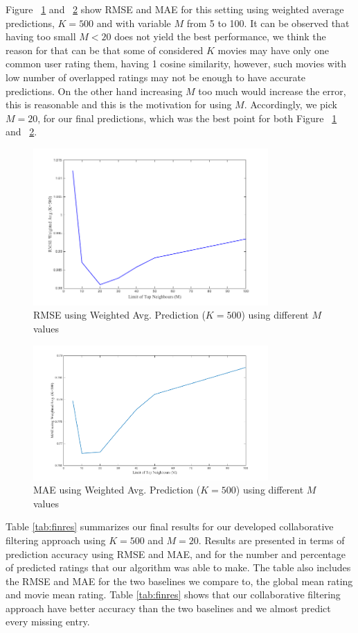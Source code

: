 Figure ~\ref{fig:rmsem} and ~\ref{fig:maem} show RMSE and MAE for this setting using weighted average predictions, $K=500$ and with variable $M$ from 5 to 100. It can be observed that having too small $M<20$ does not yield the best performance, we think the reason for that can be that some of considered $K$ movies may have only one common user rating them, having 1 cosine similarity, however, such movies with low number of overlapped ratings may not be enough to have accurate predictions. On the other hand increasing $M$ too much would increase the error, this is reasonable and this is the motivation for using $M$. Accordingly, we pick $M=20$, for our final predictions, which was the best point for both Figure ~\ref{fig:rmsem} and ~\ref{fig:maem}.
\begin{figure}[!ht]
  \centering
  \includegraphics[width=0.8\textwidth]{images/rmsem.png}
  \caption{RMSE using Weighted Avg.  Prediction ($K=500$) using different $M$ values}
  \label{fig:rmsem}
\end{figure}

\begin{figure}[!ht]
  \centering
  \includegraphics[width=0.8\textwidth]{images/MAEm.png}
  \caption{MAE using Weighted Avg.  Prediction ($K=500$) using different $M$ values}
  \label{fig:maem}
\end{figure}
Table \ref{tab:finres} summarizes our final results for our developed collaborative filtering approach using $K=500$ and $M=20$. Results are presented in terms of prediction accuracy using RMSE and MAE, and for the number and percentage of predicted ratings that our algorithm was able to make. The table also includes the RMSE and MAE for the two baselines we compare to, the global mean rating and movie mean rating. Table \ref{tab:finres}  shows that our collaborative filtering approach have better accuracy than the two baselines and we almost predict every missing entry.

